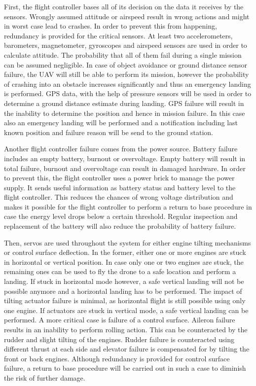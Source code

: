 First, the flight controller bases all of its decision on the data it receives by the sensors. Wrongly assumed attitude or airspeed result in wrong actions and might in worst case lead to crashes. In order to prevent this from happening, redundancy is provided for the critical sensors. At least two accelerometers, barometers, magnetometer, gyroscopes and airspeed sensors are used in order to calculate attitude. The probability that all of them fail during a single mission can be assumed negligible. In case of object avoidance or ground distance sensor failure, the UAV will still be able to perform its mission, however the probability of crashing into an obstacle increases significantly and thus an emergency landing is performed. GPS data, with the help of pressure sensors will be used in order to determine a ground distance estimate during landing. GPS failure will result in the inability to determine the position and hence in mission failure. In this case also an emergency landing will be performed and a notification including last known position and failure reason will be send to the ground station. 

Another flight controller failure comes from the power source. Battery failure includes an empty battery, burnout or overvoltage. Empty battery will result in total failure, burnout and overvoltage can result in damaged hardware. In order to prevent this, the flight controller uses a power brick to manage the power supply. It sends useful information as battery status and battery level to the flight controller. This reduces the chances of wrong voltage distribution and makes it possible for the flight controller to perform a return to base procedure in case the energy level drops below a certain threshold. Regular inspection and replacement of the battery will also reduce the probability of battery failure. 

Then, servos are used throughout the system for either engine tilting mechanisms or control surface deflection. In the former, either one or more engines are stuck in horizontal or vertical position. In case only one or two engines are stuck, the remaining ones can be used to fly the drone to a safe location and perform a landing. If stuck in horizontal mode however, a safe vertical landing will not be possible anymore and a horizontal landing has to be performed. The impact of tilting actuator failure is minimal, as horizontal flight is still possible using only one engine. If actuators are stuck in vertical mode, a safe vertical landing can be performed. A more critical case is failure of a control surface. Aileron failure results in an inability to perform rolling action. This can be counteracted by the rudder and slight tilting of the engines. Rudder failure is counteracted using different thrust at each side and elevator failure is compensated for by tilting the front or back engines. Although redundancy is provided for control surface failure, a return to base procedure will be carried out in such a case to diminish the risk of further damage. 

